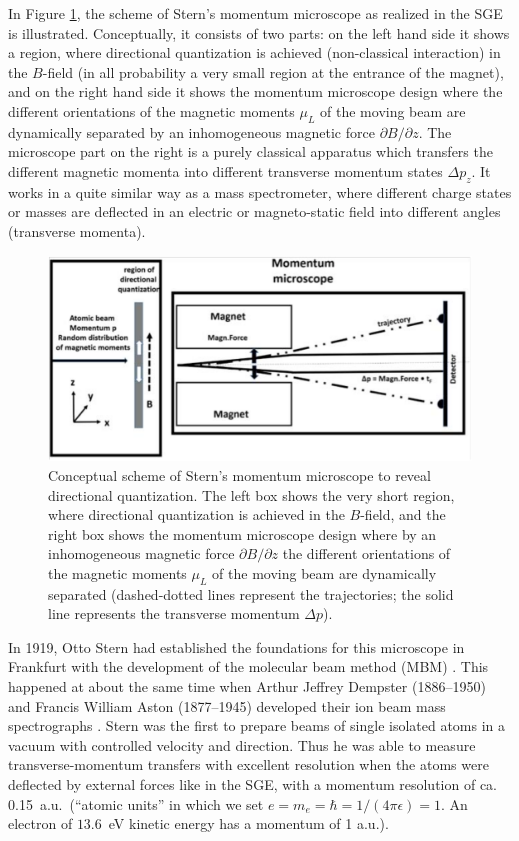 \documentclass{article}
\begin{document}
In Figure \ref{fig:SGEscheme}, the scheme of Stern's momentum microscope as realized in the SGE is illustrated. Conceptually, it consists of two parts: on the left hand side it shows a region, where directional quantization is achieved (non-classical interaction) in the $B$-field (in all probability a very small region at the entrance of the magnet), and on the right hand side it shows the momentum microscope design where the different orientations of the magnetic moments $\mu_L$ of the moving beam are dynamically separated by an inhomogeneous magnetic force $\partial B/\partial z$. The microscope part on the right is a purely classical apparatus which transfers the different magnetic momenta into different transverse momentum states $\Delta p_z$. It works in a quite similar way as a mass spectrometer, where different charge states or masses are deflected in an electric or magneto-static field into different angles (transverse momenta). 
%
\begin{figure}
\begin{center}
\includegraphics[scale=0.5]{figures/SGE_scheme}
\caption{Conceptual scheme of Stern's momentum microscope to reveal directional quantization. The left box shows the very short region, where directional quantization is achieved in the $B$-field, and the right box shows the momentum microscope design where by an inhomogeneous magnetic force $\partial B/\partial z$ the different orientations of the magnetic moments $\mu_L$ of the moving beam are dynamically separated (dashed-dotted lines represent the trajectories; the solid line represents the transverse momentum $\Delta p$).}
\label{fig:SGEscheme}
\end{center}
\end{figure}

In 1919, Otto Stern had established the foundations for this microscope in Frankfurt with the development of the molecular beam method (MBM) \citep{SternO1920Messung}. This happened at about the same time when Arthur Jeffrey Dempster (1886--1950) and Francis William Aston (1877--1945) developed their ion beam mass spectrographs \citep{DempsterAJ1918Method,AstonF1919Spectrograph}. Stern was the first to prepare beams of single isolated atoms in a vacuum with controlled velocity and direction. Thus he was able to measure transverse-momentum transfers with excellent resolution when the atoms were deflected by external forces like in the SGE, with a momentum resolution of ca. 0.15~a.u.\ (``atomic units'' in which we set $e=m_e=\hbar=1/(4\pi\epsilon)=1$. An electron of $13.6$~eV kinetic energy has a momentum of 1 a.u.). 
 
\end{document}
